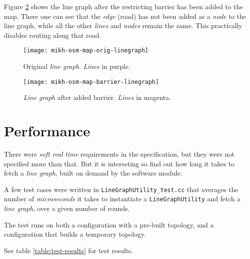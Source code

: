 \documentclass[../main.tex]{subfiles}
\begin{document}
Figure \ref{fig:mikh-osm-map-barrier-linegraph} shows the line graph after the restricting barrier has been added to the map. There one can see that the \textit{edge} (road) has not been added as a \textit{node} to the line graph, while all the other \textit{lines} and \textit{nodes} remain the same. This practically disables routing along that road.

\begin{figure}[H]
    \centering
    \texttt{[image: mikh-osm-map-orig-linegraph]}
    \caption{Original \textit{line graph}. \textit{Lines} in purple.}
    \label{fig:mikh-osm-map-orig-linegraph}
\end{figure}

\begin{figure}[H]
    \centering
    \texttt{[image: mikh-osm-map-barrier-linegraph]}
    \caption{\textit{Line graph} after added barrier. \textit{Lines} in magenta.}
    \label{fig:mikh-osm-map-barrier-linegraph}
\end{figure}


\section{Performance}\label{sect:result-performance}
There were \textit{soft real time} requirements in the specification, but they were not specified more than that. But it is interesting so find out how long it takes to fetch a \textit{line graph}, built on demand by the software module.

A few test cases were written in \texttt{LineGraphUtility\_test.cc} that averages the number of \textit{microseconds} it takes to instantiate a \texttt{LineGraphUtility} and fetch a \textit{line graph}, over a given number of rounds.

The test runs on both a configuration with a pre-built topology, and a configuration that builds a temporary topology.

See table \ref{table:test-results} for test results.
\end{document}
